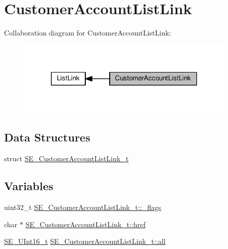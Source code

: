 \hypertarget{group__CustomerAccountListLink}{}\section{Customer\+Account\+List\+Link}
\label{group__CustomerAccountListLink}
Collaboration diagram for Customer\+Account\+List\+Link\+:\nopagebreak
\begin{figure}[H]
\begin{center}
\leavevmode
\includegraphics[width=295pt]{group__CustomerAccountListLink}
\end{center}
\end{figure}
\subsection*{Data Structures}
\begin{DoxyCompactItemize}
\item 
struct \hyperlink{structSE__CustomerAccountListLink__t}{S\+E\+\_\+\+Customer\+Account\+List\+Link\+\_\+t}
\end{DoxyCompactItemize}
\subsection*{Variables}
\begin{DoxyCompactItemize}
\item 
uint32\+\_\+t \hyperlink{group__CustomerAccountListLink_ga01fd3aae6915060506e74a3ef840eaaf}{S\+E\+\_\+\+Customer\+Account\+List\+Link\+\_\+t\+::\+\_\+flags}
\item 
char $\ast$ \hyperlink{group__CustomerAccountListLink_ga42b5e2091d750acc99f8b6d3d8b57283}{S\+E\+\_\+\+Customer\+Account\+List\+Link\+\_\+t\+::href}
\item 
\hyperlink{group__UInt16_gac68d541f189538bfd30cfaa712d20d29}{S\+E\+\_\+\+U\+Int16\+\_\+t} \hyperlink{group__CustomerAccountListLink_ga3c03b4479a40a58a6184085922237ae1}{S\+E\+\_\+\+Customer\+Account\+List\+Link\+\_\+t\+::all}
\end{DoxyCompactItemize}


